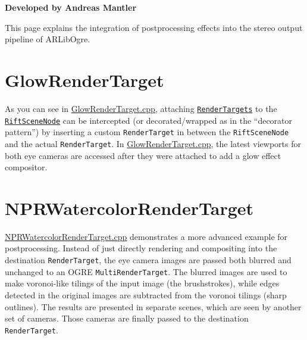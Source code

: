 \begin{center}
\textbf{Developed by Andreas Mantler}
\end{center}
This page explains the integration of postprocessing effects into the stereo output pipeline of ARLibOgre.

\section{GlowRenderTarget}\label{glowrendertarget}

As you can see in
\href{https://github.com/ands/OculusMeetsAR/blob/master/ARLib_Samples/RemoteGame/src/GlowRenderTarget.cpp}{GlowRenderTarget.cpp},
attaching
\hyperref[sec:ogre_library]{\texttt{RenderTargets}}
to the
\href{https://github.com/ands/OculusMeetsAR/blob/master/ARLib/include/ARLib/Ogre/RiftSceneNode.h}{\texttt{RiftSceneNode}}
can be intercepted (or decorated/wrapped as in the ``decorator
pattern'') by inserting a custom \texttt{RenderTarget} in between the
\texttt{RiftSceneNode} and the actual \texttt{RenderTarget}. In
\href{https://github.com/ands/OculusMeetsAR/blob/master/ARLib_Samples/RemoteGame/src/GlowRenderTarget.cpp}{GlowRenderTarget.cpp},
the latest viewports for both eye cameras are accessed after they were
attached to add a glow effect compositor.

\section{NPRWatercolorRenderTarget}\label{nprwatercolorrendertarget}

\href{https://github.com/ands/OculusMeetsAR/blob/master/ARLib_Samples/Common/src/NPRWatercolorRenderTarget.cpp}{NPRWatercolorRenderTarget.cpp}
demonstrates a more advanced example for postprocessing. Instead of just
directly rendering and compositing into the destination \texttt{RenderTarget},
the eye camera images are passed both blurred and unchanged to an OGRE
\texttt{MultiRenderTarget}. The blurred images are used to make voronoi-like
tilings of the input image (the brushstrokes), while edges detected in
the original images are subtracted from the voronoi tilings (sharp
outlines). The results are presented in separate scenes, which are seen
by another set of cameras. Those cameras are finally passed to the
destination \texttt{RenderTarget}.

